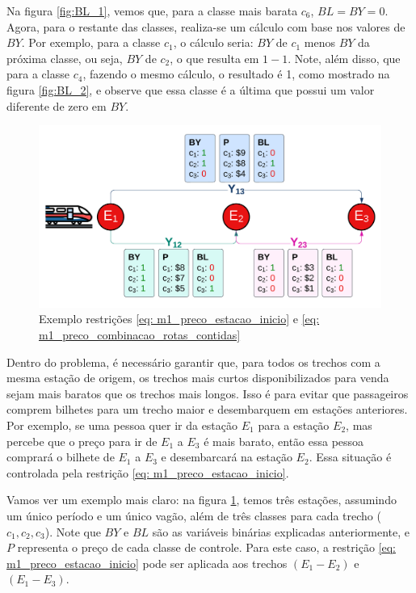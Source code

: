 Na figura \ref{fig:BL_1}, vemos que, para a classe mais barata $c_6$, $BL=BY=0$. Agora, para o restante das classes, realiza-se um cálculo com base nos valores de $BY$. Por exemplo, para a classe $c_1$, o cálculo seria: $BY$ de $c_1$ menos $BY$ da próxima classe, ou seja, $BY$ de $c_2$, o que resulta em $1-1$. Note, além disso, que para a classe $c_4$, fazendo o mesmo cálculo, o resultado é 1, como mostrado na figura \ref{fig:BL_2}, e observe que essa classe é a última que possui um valor diferente de zero em $BY$.


\begin{figure}[!ht]
	\begin{center}
		\includegraphics[scale=0.2]{img/fulfill.png}
		\caption{Exemplo restrições \ref{eq: m1_preco_estacao_inicio} e \ref{eq: m1_preco_combinacao_rotas_contidas}}
		\label{fig: fulfill}
	\end{center}
\end{figure}

Dentro do problema, é necessário garantir que, para todos os trechos com a mesma estação de origem, os trechos mais curtos disponibilizados para venda sejam mais baratos que os trechos mais longos. Isso é para evitar que passageiros comprem bilhetes para um trecho maior e desembarquem em estações anteriores. Por exemplo, se uma pessoa quer ir da estação $E_1$ para a estação $E_2$, mas percebe que o preço para ir de $E_1$ a $E_3$ é mais barato, então essa pessoa comprará o bilhete de $E_1$ a $E_3$ e desembarcará na estação $E_2$. Essa situação é controlada pela restrição \ref{eq: m1_preco_estacao_inicio}. 

Vamos ver um exemplo mais claro: na figura \ref{fig: fulfill}, temos três estações, assumindo um único período e um único vagão, além de três classes para cada trecho ($c_1, c_2, c_3$). Note que $BY$ e $BL$ são as variáveis binárias explicadas anteriormente, e $P$ representa o preço de cada classe de controle. Para este caso, a restrição \ref{eq: m1_preco_estacao_inicio} pode ser aplicada aos trechos $(E_1-E_2)$ e $(E_1-E_3)$.

